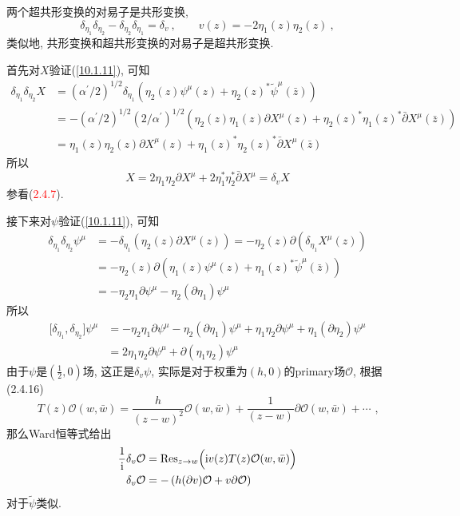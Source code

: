 两个超共形变换的对易子是共形变换,
\begin{equation}
    \delta_{\eta_{1}}\delta_{\eta_{2}}-\delta_{\eta_{2}}\delta_{\eta_{1}}=\delta_{v}\:,\qquad
    v(z)= -2\eta_{1}(z)\eta_{2}(z) \:, \label{10.1.11}
\end{equation}
类似地, 共形变换和超共形变换的对易子是超共形变换.
\begin{tcolorbox}[breakable]
首先对$ X $验证(\ref{10.1.11}), 可知
\begin{align*}
    \delta_{\eta_{1}}\delta_{\eta_{2}}X &=  (\alpha^{\prime}/2)^{1/2}
    \delta_{\eta_{1}}(\eta_{2}(z)\psi^{\mu}(z) + \eta_{2}(z)^{\ast} \tilde{\psi}^{\mu}(\bar{z})) \\
    &=-(\alpha^{\prime}/2)^{1/2} (2/\alpha^{\prime})^{1/2}
    (\eta_{2}(z)\eta_{1}(z)\partial X^{\mu}(z) + \eta_{2}(z)^{\ast} \eta_{1}(z)^{\ast}\bar{\partial}X^{\mu}(\bar{z}))  \\
    &=
    \eta_{1}(z)\eta_{2}(z)\partial X^{\mu}(z) +
    \eta_{1}(z)^{\ast} \eta_{2}(z)^{\ast}\bar{\partial}X^{\mu}(\bar{z})
\end{align*}
所以
\begin{equation*}
    [\delta_{\eta_{1}},\delta_{\eta_{2}}]X= 
     2\eta_{1}\eta_{2}\partial X^{\mu} + 2\eta_{1}^{\ast} \eta_{2}^{\ast}\bar{\partial}X^{\mu}
     =\delta_{v}X
\end{equation*}
参看(\textcolor{red}{2.4.7}).

接下来对$ \psi $验证(\ref{10.1.11}),
可知\begin{align*}
\delta _{\eta _{1}}\delta _{\eta _{2}}\psi ^{\mu } &=-\delta _{\eta
_{1}}\left( \eta _{2}(z)\partial X^{\mu }(z)\right) =-\eta _{2}(z)\partial
(\delta _{\eta _{1}}X^{\mu }(z)) \\
&=-\eta _{2}(z)\partial (\eta _{1}(z)\psi ^{\mu }(z)+\eta _{1}(z)^{\ast }%
\tilde{\psi}^{\mu }(\bar{z})) \\
&=-\eta _{2}\eta _{1}\partial \psi ^{\mu }-\eta _{2}(\partial \eta
_{1})\psi ^{\mu }
\end{align*}%
所以\begin{align*}
\lbrack \delta _{\eta _{1}},\delta _{\eta _{2}}]\psi ^{\mu } &=-\eta
_{2}\eta _{1}\partial \psi ^{\mu }-\eta _{2}(\partial \eta _{1})\psi ^{\mu
}+\eta _{1}\eta _{2}\partial \psi ^{\mu }+\eta _{1}(\partial \eta _{2})\psi
^{\mu } \\
&=2\eta _{1}\eta _{2}\partial \psi ^{\mu }+\partial (\eta _{1}\eta
_{2})\psi ^{\mu }
\end{align*}%
由于$\psi $是$(\frac{1}{2},0)$场, 这正是$\delta _{v}\psi $, 实际是对于权重为$(h,0)$的primary场$\mathcal{O}$, 根据(2.4.16)%
\[
T(z)\mathcal{O}(w,\bar{w})=\frac{h}{(z-w)^{2}}\mathcal{O}(w,\bar{w})+\frac{1}{(z-w)}\partial \mathcal{O}(w,%
\bar{w})+\cdots \text{ ,}
\]%
那么Ward恒等式给出\begin{align*}
\frac{1}{\mi }\delta _{v}\mathcal{O} &=\operatorname{Res}_{z\to w}\Bigl(\mi v(z)T(z)\mathcal{O}(w,%
\bar{w})\Bigr) \\
\delta _{v}\mathcal{O} &=-\left( h(\partial v)\mathcal{O}+v\partial \mathcal{O}\right)
\end{align*}
对于$ \tilde{\psi} $类似.


\end{tcolorbox}

